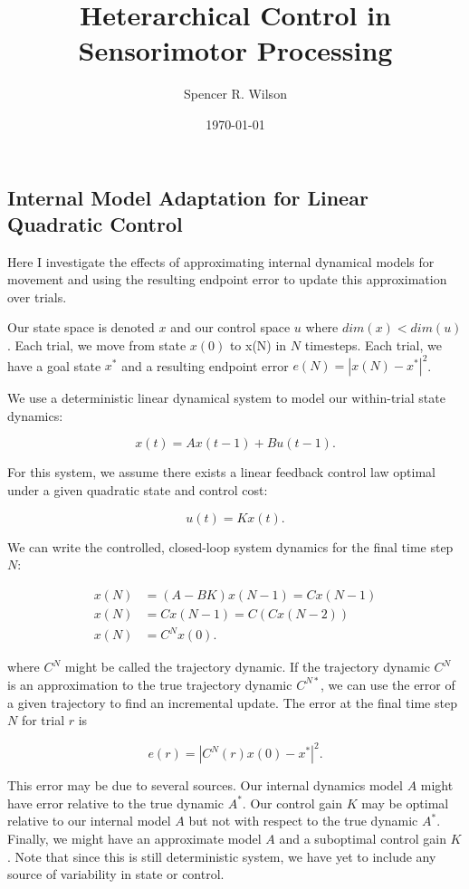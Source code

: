 \documentclass[
  a4paper,
]{article}
\title{Heterarchical Control in Sensorimotor Processing}
\author{Spencer R. Wilson}
\date{\today}
\begin{document}
\maketitle

\hypertarget{internal-model-adaptation-for-linear-quadratic-control}{%
\subsection{Internal Model Adaptation for Linear Quadratic
Control}\label{internal-model-adaptation-for-linear-quadratic-control}}

Here I investigate the effects of approximating internal dynamical
models for movement and using the resulting endpoint error to update
this approximation over trials.

Our state space is denoted \(x\) and our control space \(u\) where
\(dim(x) < dim(u)\). Each trial, we move from state \(x(0)\) to x(N) in
\(N\) timesteps. Each trial, we have a goal state \(x^*\) and a
resulting endpoint error \(e(N) = |x(N) - x^*|^2\).

We use a deterministic linear dynamical system to model our within-trial
state dynamics:

\[
x(t) = Ax(t-1) + Bu(t-1).
\]

For this system, we assume there exists a linear feedback control law
optimal under a given quadratic state and control cost:

\[
u(t) = Kx(t).
\]

We can write the controlled, closed-loop system dynamics for the final
time step \(N\):

\[
\begin{aligned} 
x(N) &= (A - BK)x(N-1) = Cx(N-1) \\
x(N) &= Cx(N-1) = C(Cx(N-2)) \\
x(N) &= C^Nx(0).
\end{aligned} 
\]

where \(C^N\) might be called the trajectory dynamic. If the trajectory
dynamic \(C^N\) is an approximation to the true trajectory dynamic
\(C^{N*}\), we can use the error of a given trajectory to find an
incremental update. The error at the final time step \(N\) for trial
\(r\) is

\[
e(r) = |C^N(r)x(0) - x^*|^2.
\]

This error may be due to several sources. Our internal dynamics model
\(A\) might have error relative to the true dynamic \(A^*\). Our control
gain \(K\) may be optimal relative to our internal model \(A\) but not
with respect to the true dynamic \(A^*\). Finally, we might have an
approximate model \(A\) and a suboptimal control gain \(K\). Note that
since this is still deterministic system, we have yet to include any
source of variability in state or control.
\end{document}
